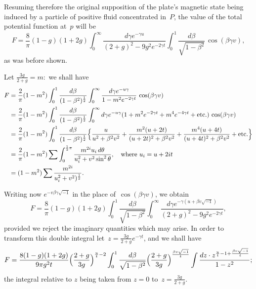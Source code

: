\documentclass[11pt,notitlepage]{amsart}
\begin{document}
Resuming therefore the original supposition of the plate's magnetic state
being induced by a particle of positive fluid concentrated in~$P$, the value of
the total potential function at~$p$ will be
\[
F=\frac8\pi(1-g)(1+2g)
\int_0^\infty\frac{d\gamma e^{-\gamma u}}
{(2+g)^2-9g^2e^{-2\gamma t}}
\int_0^1\frac{d\beta}{\sqrt{1-\beta^2}}\,\cos(\beta\gamma v),
\]
as was before shown.

Let $\frac{3g}{2+g}=m:$  we shall have
\[
\begin{aligned}
F &= \frac2\pi(1-m^2)\int_0^1\frac{d\beta}{(1-\beta^2)^{\frac12}}
\int_0^\infty\frac{d\gamma e^{-u\gamma}}
{1-m^2e^{-2\gamma t}}\,\cos(\beta\gamma v)\\
&= \frac2\pi(1-m^2)\int_0^1\frac{d\beta}{(1-\beta^2)^{\frac12}}
\int_0^\infty d\gamma e^{-u\gamma}
(1+m^2e^{-2\gamma t}+m^4e^{-4\gamma t}+\text{etc.})\,\cos(\beta\gamma v)\\
&= \frac2\pi(1-m^2)\int_0^1\frac{d\beta}{(1-\beta^2)^{\frac12}}
\Bigl\{ \frac{u}{u^2+\beta^2v^2}+\frac{m^2(u+2t)}{(u+2t)^2+\beta^2v^2}
+\frac{m^4(u+4t)}{(u+4t)^2+\beta^2v^2}+\text{etc.} \Bigr\}\\
&= \frac2\pi(1-m^2)\sum\int_0^{\frac12\pi}
\frac{m^{2i}u_i\,d\theta}{u_i^2+v^2\sin^2\theta},
\quad\text{where $u_i=u+2it$}\\
&= (1-m^2)\sum\frac{m^{2i}}{u_i^2+v^2)^{\frac12}}.
\end{aligned}
\]

Writing now $e^{-v\beta\gamma\sqrt{-1}}$
in the place of~$\cos(\beta\gamma v)$, we obtain
\[
F=\frac8\pi(1-g)(1+2g)
\int_0^1\frac{d\beta}{\sqrt{1-\beta^2}}
\int_0^\infty\frac{d\gamma e^{-\gamma(u+\beta v\sqrt{-1})}}
{(2+g)^2-9g^2e^{-2\gamma t}},
\]
provided we reject the imaginary quantities which may arise. In order to
transform this double integral let~$z=\frac{3g}{2+g}e^{-\gamma t}$,
and we shall have
\[
F=\frac{8(1-g)(1+2g)}{9\pi g^2t}\Bigl(\frac{2+g}{3g}\Bigr)^{\frac ut-2}
\int_0^1\frac{d\beta}{\sqrt{1-\beta^2}}
\Bigl( \frac{2+g}{3g} \Bigr)^{\frac{\beta v\sqrt{-1}}{t}}
\int\frac{dz\cdot z^{\frac ut-1+\frac{\beta v\sqrt{-1}}{t}}}{1-z^2};
\]
the integral relative to $z$ being taken from $z=0$ to~$z=\frac{3g}{2+g}$.
\end{document}
